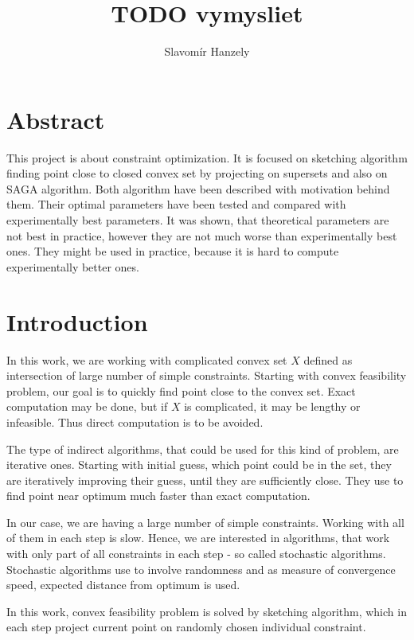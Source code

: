 \documentclass[11pt]{book}
\begin{document}
\title{\textbf{TODO vymysliet}}
\author{Slavomír Hanzely}
\maketitle

\chapter*{\centering Abstract}

This project is about constraint optimization. It is focused on sketching algorithm finding point close to closed convex set by projecting on supersets and also on SAGA algorithm. Both algorithm have been described with motivation behind them. Their optimal parameters have been tested and compared with experimentally best parameters. It was shown, that theoretical parameters are not best in practice, however they are not much worse than experimentally best ones. They might be used in practice, because it is hard to compute experimentally better ones.

\tableofcontents

\chapter{Introduction}

In this work, we are working with complicated convex set $X$ defined as intersection of large number of simple constraints. Starting with convex feasibility problem, our goal is to quickly find point close to the convex set. Exact computation may be done, but if $X$ is complicated, it may be lengthy or infeasible. Thus direct computation is to be avoided.

The type of indirect algorithms, that could be used for this kind of problem, are iterative ones. Starting with initial guess, which point could be in the set, they are iteratively improving their guess, until they are sufficiently close. They use to find point near optimum much faster than exact computation.

In our case, we are having a large number of simple constraints. Working with all of them in each step is slow. Hence, we are interested in algorithms, that work with only part of all constraints in each step - so called stochastic algorithms. Stochastic algorithms use to involve randomness and as measure of convergence speed, expected distance from optimum is used.

In this work, convex feasibility problem is solved by sketching algorithm, which in each step project current point on randomly chosen individual constraint.\\
\end{document}
